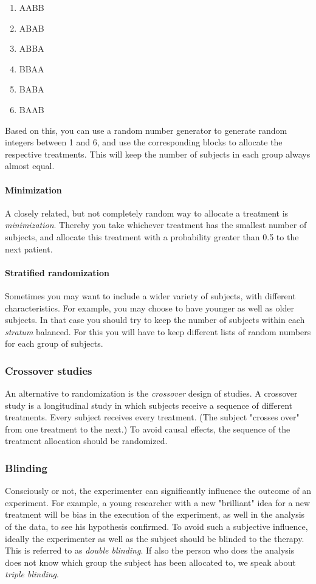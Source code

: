 \begin{enumerate}
  \item AABB
  \item ABAB
  \item ABBA
  \item BBAA
  \item BABA
  \item BAAB
\end{enumerate}

Based on this, you can use a random number generator to generate random integers between 1 and 6, and use the corresponding blocks to allocate the respective treatments. This will keep the number of subjects in each group always almost equal.

\paragraph{Minimization}
A closely related, but not completely random way to allocate a treatment is \emph{minimization}. Thereby you take whichever treatment has the smallest number of subjects, and allocate this treatment with a probability greater than 0.5 to the next patient.

\paragraph{Stratified randomization}
Sometimes you may want to include a wider variety of subjects, with different characteristics. For example, you may choose to have younger as well as older subjects. In that case you should try to keep the number of subjects within each \emph{stratum} balanced. For this you will have to keep different lists of random numbers for each group of subjects.

\subsubsection{Crossover studies} 
An alternative to randomization is the \emph{crossover} design of studies. A crossover study is a longitudinal study in which subjects receive a sequence of different treatments. Every subject receives every treatment. (The subject "crosses over" from one treatment to the next.) To avoid causal effects, the sequence of the treatment allocation should be randomized.

\subsubsection{Blinding} 
Consciously or not, the experimenter can significantly influence the outcome of an experiment. For example, a young researcher with a new "brilliant" idea for a new treatment will be bias in the execution of the experiment, as well in the analysis of the data, to see his hypothesis confirmed. To avoid such a subjective influence, ideally the experimenter as well as the subject should be blinded to the therapy. This is referred to as \emph{double blinding}. If also the person who does the analysis does not know which group the subject has been allocated to, we speak about \emph{triple blinding}.

